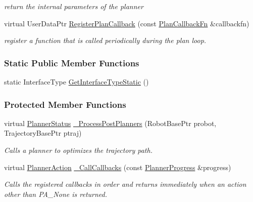 \begin{DoxyCompactItemize}
\begin{DoxyCompactList}\small\item\em return the internal parameters of the planner \item\end{DoxyCompactList}\item 
virtual UserDataPtr \hyperlink{classOpenRAVE_1_1PlannerBase_a7b72116e4770d98f2a78297246a679e8}{RegisterPlanCallback} (const \hyperlink{classOpenRAVE_1_1PlannerBase_af66cf367615e6c51bab4473f4fcf1018}{PlanCallbackFn} \&callbackfn)
\begin{DoxyCompactList}\small\item\em register a function that is called periodically during the plan loop. \item\end{DoxyCompactList}\end{DoxyCompactItemize}
\subsubsection*{Static Public Member Functions}
\begin{DoxyCompactItemize}
\item 
static InterfaceType \hyperlink{classOpenRAVE_1_1PlannerBase_affeafe65e7c4094f282d273dedbf069b}{GetInterfaceTypeStatic} ()
\end{DoxyCompactItemize}
\subsubsection*{Protected Member Functions}
\begin{DoxyCompactItemize}
\item 
virtual \hyperlink{namespaceOpenRAVE_a7cead738b92cbe2f332dea20dd2f200e}{PlannerStatus} \hyperlink{classOpenRAVE_1_1PlannerBase_a0e418a8cb5f9392ed0db1f1f9ec9d8ce}{\_\-ProcessPostPlanners} (RobotBasePtr probot, TrajectoryBasePtr ptraj)
\begin{DoxyCompactList}\small\item\em Calls a planner to optimizes the trajectory path. \item\end{DoxyCompactList}\item 
virtual \hyperlink{namespaceOpenRAVE_a16104fe58cdf1075c47eb709e58ba853}{PlannerAction} \hyperlink{classOpenRAVE_1_1PlannerBase_a4b980a3cc0e8fc7abd2d0afe472ef695}{\_\-CallCallbacks} (const \hyperlink{classOpenRAVE_1_1PlannerBase_1_1PlannerProgress}{PlannerProgress} \&progress)
\begin{DoxyCompactList}\small\item\em Calls the registered callbacks in order and returns immediately when an action other than PA\_\-None is returned. \item\end{DoxyCompactList}\end{DoxyCompactItemize}


